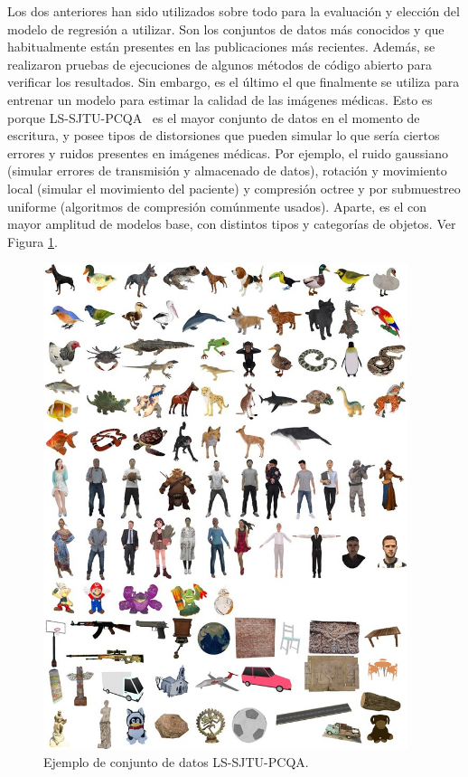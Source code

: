 Los dos anteriores han sido utilizados sobre todo para la evaluación y elección 
del modelo de regresión a utilizar. Son los conjuntos de datos más conocidos 
y que habitualmente están presentes en las publicaciones más recientes. Además, se realizaron 
pruebas de ejecuciones de algunos métodos de código abierto para verificar los 
resultados. Sin embargo, es el último el que finalmente se utiliza para entrenar un modelo para estimar 
la calidad de las imágenes médicas. Esto es porque LS-SJTU-PCQA~\cite{ResSCNN} 
es el mayor conjunto de datos 
en el momento de escritura, y posee tipos de distorsiones que pueden simular 
lo que sería ciertos errores y ruidos presentes en imágenes médicas. Por ejemplo, 
el ruido gaussiano (simular errores de transmisión y almacenado de datos), 
rotación y movimiento local (simular el movimiento del paciente) y compresión 
octree y por submuestreo uniforme (algoritmos de compresión comúnmente usados).
Aparte, es el con mayor amplitud de modelos base, con distintos tipos y categorías 
de objetos. Ver Figura \ref{fig:LS-SJTU-PCQA}.

\begin{figure}[htp]
  \begin{center}
    \includegraphics[width=0.95\textwidth]{imagenes/chapter4/LSPCQA}
  \end{center}
  \caption{Ejemplo de conjunto de datos LS-SJTU-PCQA.}
  \label{fig:LS-SJTU-PCQA}
\end{figure}

